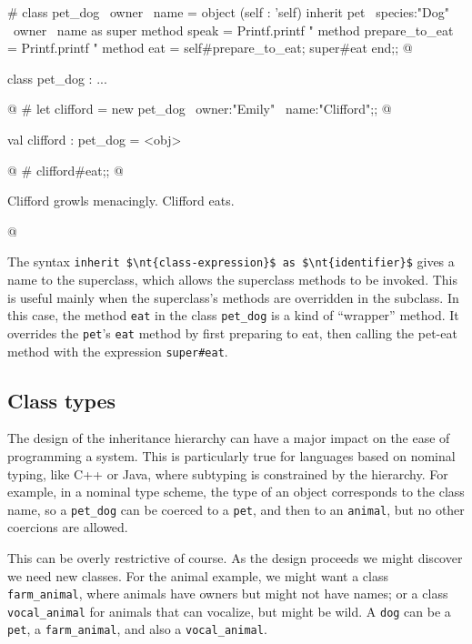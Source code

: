 \begin{ocaml}
# class pet_dog ~owner ~name =
  object (self : 'self)
     inherit pet ~species:"Dog" ~owner ~name as super
     method speak = Printf.printf "%
     method prepare_to_eat =
        Printf.printf "%
     method eat =
        self#prepare_to_eat;
        super#eat
  end;;
@
\begin{topoutput}
class pet_dog : ...
\end{topoutput}
@
# let clifford = new pet_dog ~owner:"Emily" ~name:"Clifford";;
@
\begin{topoutput}
val clifford : pet_dog = <obj>
\end{topoutput}
@
# clifford#eat;;
@
\begin{topoutput}
Clifford growls menacingly.
Clifford eats.
\end{topoutput}
@
\end{ocaml}
%
The syntax \hbox{\lstinline/inherit $\nt{class-expression}$ as $\nt{identifier}$/} gives a name to the
superclass, which allows the superclass methods to be invoked.  This is useful mainly when the
superclass's methods are overridden in the subclass.  In this case, the method \hbox{\lstinline/eat/} in the
class \hbox{\lstinline/pet_dog/} is a kind of ``wrapper'' method.  It overrides
the \hbox{\lstinline/pet/}'s \hbox{\lstinline/eat/} method by first preparing to eat, then calling the
pet-eat method with the expression \hbox{\lstinline/super#eat/}.

\subsection{Class types}

The design of the inheritance hierarchy can have a major impact on the ease of programming a
system.  This is particularly true for languages based on nominal typing, like C++ or Java, where
subtyping is constrained by the hierarchy.  For example, in a nominal type scheme,
the type of an object corresponds to the class name, so a \hbox{\lstinline/pet_dog/} can be coerced to
a \hbox{\lstinline/pet/}, and then to an \hbox{\lstinline/animal/}, but no other coercions are allowed.

This can be overly restrictive of course.  As the design proceeds we might discover we need new classes.
For the animal example, we might want a class \hbox{\lstinline/farm_animal/}, where animals have owners but
might not have names; or a class \hbox{\lstinline/vocal_animal/} for animals that can vocalize, but might
be wild.  A \hbox{\lstinline/dog/} can be a \hbox{\lstinline/pet/}, a \hbox{\lstinline/farm_animal/}, and also
a \hbox{\lstinline/vocal_animal/}.

